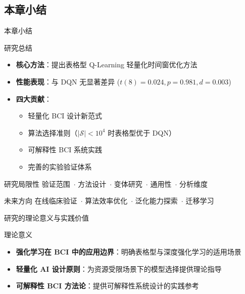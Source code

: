 {\subsection{本章小结}

\begin{frame}{本章小结}
    \begin{block}{研究总结}
        \begin{itemize}
            \item \textbf{核心方法}：提出表格型 Q-Learning 轻量化时间窗优化方法
            \item \textbf{性能表现}：与 DQN 无显著差异 ($t(8)=0.024, p=0.981, d=0.003$)
            \item \textbf{四大贡献}：
            \begin{itemize}
                \item 轻量化 BCI 设计新范式
                \item 算法选择准则（$|\mathcal{S}| < 10^4$ 时表格型优于 DQN）
                \item 可解释性 BCI 系统实践
                \item 完善的实验验证体系
            \end{itemize}
        \end{itemize}
    \end{block}

    \begin{block}{研究局限性}
        验证范围~$\cdot$ 方法设计~$\cdot$ 变体研究~$\cdot$ 通用性~$\cdot$ 分析维度
    \end{block}

    \begin{block}{未来方向}
        在线临床验证~$\cdot$ 算法效率优化~$\cdot$ 泛化能力探索~$\cdot$ 迁移学习
    \end{block}
\end{frame}

\begin{frame}{研究的理论意义与实践价值}
    \begin{block}{理论意义}
        \begin{itemize}
            \item \textbf{强化学习在 BCI 中的应用边界}：明确表格型与深度强化学习的适用场景
            \item \textbf{轻量化 AI 设计原则}：为资源受限场景下的模型选择提供理论指导
            \item \textbf{可解释性 BCI 方法论}：提供可解释性系统设计的实践参考
        \end{itemize}
    \end{block}


\end{frame}}
